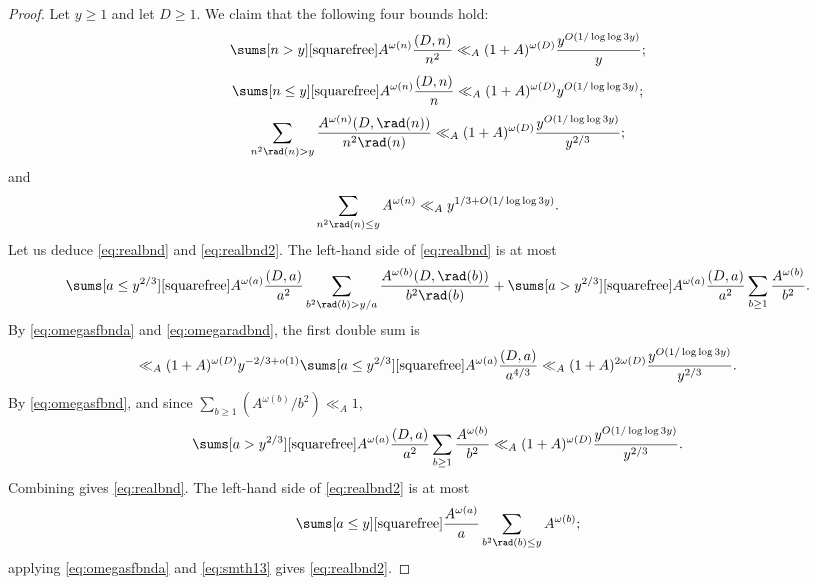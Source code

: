 \documentclass[12pt, reqno, twoside, letterpaper]{amsart}
\begin{document}
\begin{proof}
%
Let $y \ge 1$ and let $D \ge 1$.
%
We claim that the following four bounds hold:
\begin{equation}
  \label{eq:omegasfbnd}
   \sums[n > y][\text{squarefree}] %
    A^{\omega(n)}
     \frac{(D,n)}{n^2}
      \ll_A
       (1 + A)^{\omega(D)} \frac{y^{O(1/\log\log 3y)}}{y};
\end{equation}
\begin{equation}
 \label{eq:omegasfbnda}
  \sums[n \le y][\text{squarefree}] %
   A^{\omega(n)}
    \frac{(D,n)}{n}
     \ll_A
      (1 + A)^{\omega(D)} y^{O(1/\log\log 3y)};
\end{equation}
\begin{equation}
   \label{eq:omegaradbnd}
    \sum_{n^2\rad(n) > y}
     \frac{A^{\omega(n)}(D,\rad(n))}{n^2\rad(n)}
      \ll_A
       (1 + A)^{\omega(D)}\frac{y^{O(1/\log\log 3y)}}{y^{2/3}};
\end{equation}
and 
\begin{equation}
   \label{eq:smth13}
    \sum_{n^2\rad(n) \le y}
     A^{\omega(n)} 
      \ll_A
       y^{1/3 + O(1/\log\log 3y)}.
\end{equation}
%
Let us deduce \eqref{eq:realbnd} and \eqref{eq:realbnd2}.
%
The left-hand side of \eqref{eq:realbnd} is at most 
\[
   \sums[a \le y^{2/3}][\text{squarefree}]  %
    A^{\omega(a)}\frac{(D,a)}{a^2}
    \sum_{b^2\rad(b) > y/a}
     \frac{A^{\omega(b)}(D,\rad(b))}{b^2\rad(b)}
      +
       \sums[a > y^{2/3}][\text{squarefree}] %
        A^{\omega(a)}\frac{(D,a)}{a^2}
        \sum_{b \ge 1}
         \frac{A^{\omega(b)}}{b^2}.
\]
%
By \eqref{eq:omegasfbnda} and \eqref{eq:omegaradbnd}, the first 
double sum is 
\[
    \ll_A
     (1 + A)^{\omega(D)} y^{-2/3 + o(1)}  
      \sums[a \le y^{2/3}] [\text{squarefree}] %
       A^{\omega(a)}\frac{(D,a)}{a^{4/3}}
       \ll_A
        (1 + A)^{2\omega(D)}\frac{y^{O(1/\log\log 3y)}}{y^{2/3}}.
\]
%
By \eqref{eq:omegasfbnd}, and since 
$\sum_{b \ge 1} (A^{\omega(b)}/b^2) \ll_A 1$, 
\[
 \sums[a > y^{2/3}][\text{squarefree}] %
  A^{\omega(a)}\frac{(D,a)}{a^2}
  \sum_{b \ge 1}
   \frac{A^{\omega(b)}}{b^2}
    \ll_A 
     (1 + A)^{\omega(D)}\frac{y^{O(1/\log\log 3y)}}{y^{2/3}}.
\]
%
Combining gives \eqref{eq:realbnd}.
%
The left-hand side of \eqref{eq:realbnd2} is at most
\[
 \sums[a \le y][\text{squarefree}] %
  \frac{A^{\omega(a)}}{a}
   \sum_{b^2\rad(b) \le y} A^{\omega(b)};
\]
applying \eqref{eq:omegasfbnda} and \eqref{eq:smth13} gives 
\eqref{eq:realbnd2}.


\end{proof}
\end{document}
